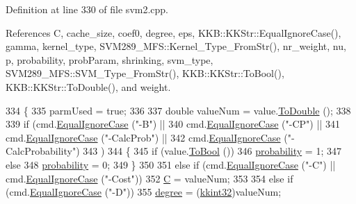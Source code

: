 Definition at line 330 of file svm2.\+cpp.



References C, cache\+\_\+size, coef0, degree, eps, K\+K\+B\+::\+K\+K\+Str\+::\+Equal\+Ignore\+Case(), gamma, kernel\+\_\+type, S\+V\+M289\+\_\+\+M\+F\+S\+::\+Kernel\+\_\+\+Type\+\_\+\+From\+Str(), nr\+\_\+weight, nu, p, probability, prob\+Param, shrinking, svm\+\_\+type, S\+V\+M289\+\_\+\+M\+F\+S\+::\+S\+V\+M\+\_\+\+Type\+\_\+\+From\+Str(), K\+K\+B\+::\+K\+K\+Str\+::\+To\+Bool(), K\+K\+B\+::\+K\+K\+Str\+::\+To\+Double(), and weight.


\begin{DoxyCode}
334 \{
335   parmUsed = \textcolor{keyword}{true};
336 
337   \textcolor{keywordtype}{double}  valueNum = value.\hyperlink{class_k_k_b_1_1_k_k_str_a95207190bd6a470ca0ef25ebea459c80}{ToDouble} ();
338 
339   \textcolor{keywordflow}{if}  (cmd.\hyperlink{class_k_k_b_1_1_k_k_str_a562f9696417c53f66bc4088eac072ab5}{EqualIgnoreCase} (\textcolor{stringliteral}{"-B"})         ||  
340        cmd.\hyperlink{class_k_k_b_1_1_k_k_str_a562f9696417c53f66bc4088eac072ab5}{EqualIgnoreCase} (\textcolor{stringliteral}{"-CP"})        ||
341        cmd.\hyperlink{class_k_k_b_1_1_k_k_str_a562f9696417c53f66bc4088eac072ab5}{EqualIgnoreCase} (\textcolor{stringliteral}{"-CalcProb"})  ||
342        cmd.\hyperlink{class_k_k_b_1_1_k_k_str_a562f9696417c53f66bc4088eac072ab5}{EqualIgnoreCase} (\textcolor{stringliteral}{"-CalcProbability"})
343       )
344   \{
345     \textcolor{keywordflow}{if}  (value.\hyperlink{class_k_k_b_1_1_k_k_str_a84e903540729b01cd2d712dc7050044a}{ToBool} ())
346       \hyperlink{struct_s_v_m289___m_f_s_1_1svm__parameter_a34eba918ae65f56f3186bbdeae8ccd4b}{probability} = 1;
347     \textcolor{keywordflow}{else}
348       \hyperlink{struct_s_v_m289___m_f_s_1_1svm__parameter_a34eba918ae65f56f3186bbdeae8ccd4b}{probability} = 0;
349   \}
350 
351   \textcolor{keywordflow}{else} \textcolor{keywordflow}{if}  (cmd.\hyperlink{class_k_k_b_1_1_k_k_str_a562f9696417c53f66bc4088eac072ab5}{EqualIgnoreCase} (\textcolor{stringliteral}{"-C"})  ||  cmd.\hyperlink{class_k_k_b_1_1_k_k_str_a562f9696417c53f66bc4088eac072ab5}{EqualIgnoreCase} (\textcolor{stringliteral}{"-Cost"}))
352     \hyperlink{struct_s_v_m289___m_f_s_1_1svm__parameter_aac66b1e8a16d4076bfe8b45e82bd8e7a}{C}  = valueNum;
353 
354   \textcolor{keywordflow}{else} \textcolor{keywordflow}{if}  (cmd.\hyperlink{class_k_k_b_1_1_k_k_str_a562f9696417c53f66bc4088eac072ab5}{EqualIgnoreCase} (\textcolor{stringliteral}{"-D"}))
355     \hyperlink{struct_s_v_m289___m_f_s_1_1svm__parameter_a4c45977ba07de7038c6ecd091a7684f0}{degree} = (\hyperlink{namespace_k_k_b_a8fa4952cc84fda1de4bec1fbdd8d5b1b}{kkint32})valueNum;

\end{DoxyCode}
